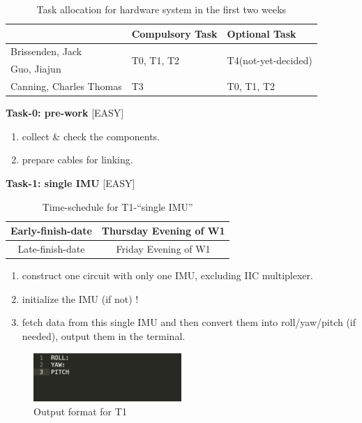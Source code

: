\documentclass[11pt, a4paper]{article}
\begin{document}
\begin{table}[!ht]
	\centering
	\caption{Task allocation for hardware system in the first two weeks}
	\begin{tabular}{|l|l|l|}
		\hline
		& Compulsory Task             & Optional Task                        \\ \hline
		Brissenden, Jack        & \multirow{2}{*}{T0, T1, T2} & \multirow{2}{*}{T4(not-yet-decided)} \\ \cline{1-1}
		Guo, Jiajun             &                             &                                      \\ \hline
		Canning, Charles Thomas & T3                          & T0, T1, T2                           \\ \hline
	\end{tabular}
	\label{tab:hardware_group}
\end{table}

\textbf{Task-0: pre-work} 	[EASY]
\begin{enumerate}
    \item collect \& check the components.
    \item prepare cables for linking.
\end{enumerate}

\textbf{Task-1: single IMU} 	[EASY]
\begin{table}[!ht]
	\centering
	\caption{Time-schedule for T1-``single IMU''}
	\begin{tabular}{|c|c|}
		\hline
		Early-finish-date & Thursday Evening of W1 \\ \hline
		Late-finish-date & Friday Evening of W1 \\ \hline
	\end{tabular}
	\label{tab:HD_TASK_1}
\end{table}

\begin{enumerate}
	\item construct one circuit with only one IMU, excluding IIC multiplexer.
	\item initialize the IMU (if not) !
	\item fetch data from this single IMU and then convert them into roll/yaw/pitch (if needed), output them in the terminal.
\end{enumerate}

\begin{figure}[htbp]
	\centering
	\includegraphics[width=0.5\textwidth]{
		fileForWriting/OUTPUT_FORMAT_T1}
	\caption{Output format for T1}
	\label{fig:OUTPUT_FORMAT_T1}
\end{figure}
\end{document}
